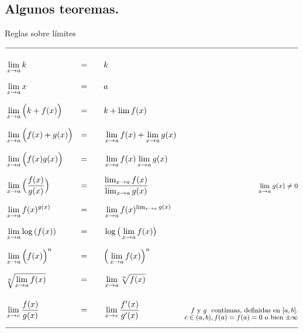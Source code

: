 \documentclass[12pt,a4paper]{extarticle}
\begin{document}
\subsection{Algunos teoremas.}
\begin{table}[!htbp]
\caption{Reglas sobre l\'imites}
\begin{align*}
\hline \\
& \lim_{x \to a}k & = \qquad & k &\\[0.7em]
& \lim_{x \to a}x & = \qquad & a &\\[0.7em]
& \lim_{x \to a}\Big(k + f(x)\Big) & =  \qquad & k + \lim f(x)& \\[0.7em]
& \lim_{x \to a}\Big(f(x) + g(x)\Big) & =   \qquad  &   \lim_{x \to a}f(x) + \lim_{x  \to a} g(x)&  \\[0.7em]
& \lim_{x \to a}\Big(f(x) g(x)\Big) & =   \qquad  &   \lim_{x \to a}f(x) \lim_{x  \to a} g(x)&  \\[0.7em]
& \lim_{x \to a}\Big(\frac{f(x)}{g(x)}\Big) & =   \qquad
&\frac{\lim_{x \to a}f(x) }{\lim_{x  \to a} g(x)} & 
\text{\footnotesize \(\lim_{x \to a}g(x) \neq 0\)} \\[0.7em]
& \lim_{x \to a}f(x)^{g(x)} & =   \qquad  & \lim_{x \to
  a}f(x)^{\lim_{x \to a}g(x)} &\\[0.7em]
& \lim_{x \to a} \log{(f(x))} & =   \qquad  & \log{\big(\lim_{x \to a} f(x)\big)} &\\[0.7em]
& \lim_{x \to a}\Big(f(x)\Big)^n & = \qquad & \Big(\lim_{x \to  a}f(x)\Big)^n & \\[0.7em]
& \sqrt[n]{\lim_{x \to a}f(x)} & = \qquad & \lim_{x \to
  a}\sqrt[n]{f(x)} & \\[1.1em]
& \lim_{x \to c}\frac{f(x)}{g(x)} & = \qquad & \lim_{x \to  c}
\frac{f'(x)}{g'(x)} \qquad  & \text{\footnotesize \(f \) y \( g\)   \ cont\'inuas,
  definidas en \([a,b]\).}\\[-0.4cm]
&&&& \text{\footnotesize \( c \in (a,b) ,  f(a) = f(a) = 0\) o bien \(\pm \infty\)}\\[0.7em]
\hline\\
\end{align*}
\label{tab:limReg}
\end{table}
\end{document}
